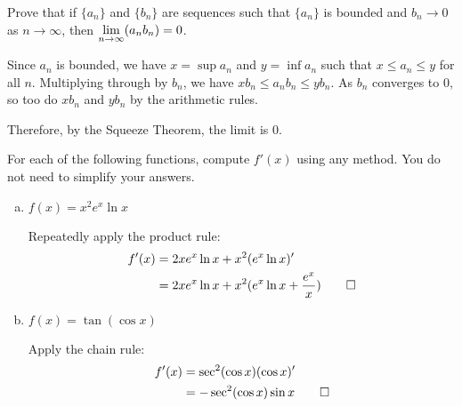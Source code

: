 \begin{prob}
  Prove that if $\{a_n\}$ and $\{b_n\}$ are sequences such that $\{a_n\}$ is bounded
  and $b_n \to 0$ as $n \to \infty$, then $\displaystyle\lim_{n\to\infty}(a_n b_n) = 0$.
\end{prob}
\begin{prf}
  Since $a_n$ is bounded, we have $x = \sup a_n$ and $y = \inf a_n$ such that $x \leq a_n \leq y$ for all $n$.
  Multiplying through by $b_n$, we have $xb_n \leq a_n b_n \leq yb_n$.
  As $b_n$ converges to 0, so too do $xb_n$ and $yb_n$ by the arithmetic rules.

  Therefore, by the Squeeze Theorem, the limit is 0.
\end{prf}

\begin{prob}
  For each of the following functions, compute $f'(x)$ using any method.
  You do not need to simplify your answers.
  \begin{enumerate}[(a)]
    \item $f(x) = x^2 e^x \ln x$
          \begin{sol}
            Repeatedly apply the product rule: \begin{align*}
              f'(x) & = 2x e^x \ln x + x^2(e^x \ln x)'                         \\
                    & = 2x e^x \ln x + x^2(e^x \ln x + \frac{e^x}{x}) \qedhere
            \end{align*}
          \end{sol}
    \item $f(x) = \tan(\cos x)$
          \begin{sol}
            Apply the chain rule: \begin{align*}
              f'(x) & = \sec^2(\cos x)(\cos x)'        \\
                    & = -\sec^2(\cos x)\sin x \qedhere
            \end{align*}
          \end{sol}
  \end{enumerate}
\end{prob}

